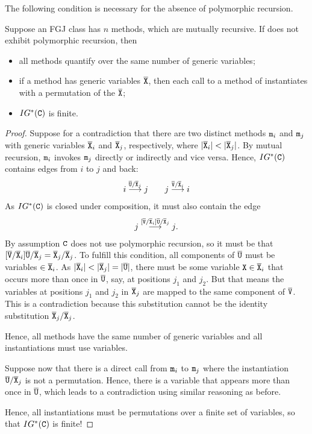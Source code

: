 The following condition is necessary for the absence of
polymorphic recursion.

\begin{proposition}\label{prop:polymorphi-recursion}
  Suppose an FGJ class  has $n$ methods, which are mutually
  recursive.
  If  does not exhibit
  polymorphic recursion, then
  \begin{itemize}
  \item all methods quantify over the same number of generic
    variables;
  \item if a method has generic variables $\overline{\tt X}$, then each call to
    a method of  instantiates with a permutation of the
    $\overline{\tt X}$;
  \item $IG^* ({\tt C})$ is finite.
  \end{itemize}
\end{proposition}
\begin{proof}
  Suppose for a contradiction that there are two distinct methods ${\tt m}_i$ and
  ${\tt m}_j$ with generic variables $\overline{\tt X}_i$ and $\overline{\tt X}_j$, respectively,
  where $|\overline{\tt X}_i| < |\overline{\tt X}_j|$. By mutual recursion, ${\tt m}_i$ invokes
  ${\tt m}_j$ directly or indirectly and vice versa. Hence, $IG^* ({\tt C})$
  contains edges from $i$ to $j$ and back:
  \begin{gather*}
    i \stackrel{\overline{\tt U}/\overline{\tt X}_j}{\longrightarrow} j
    \qquad
    j \stackrel{\overline{\tt V}/\overline{\tt X}_i}{\longrightarrow} i
  \end{gather*}
  As $IG^*({\tt C})$ is closed under composition, it must also contain
  the edge
  \begin{gather*}
    j \stackrel{[\overline{\tt V}/\overline{\tt X}_i]\overline{\tt U}/\overline{\tt X}_j}{\longrightarrow} j
    \text{.}
  \end{gather*}
  By assumption ${\tt C}$ does not use polymorphic recursion, so it
  must be that $[\overline{\tt V}/\overline{\tt X}_i]\overline{\tt U}/\overline{\tt X}_j =
  \overline{\tt X}_j/\overline{\tt X}_j$. To fulfill this condition, all components of
  $\overline{\tt U}$ must be variables $\in \overline{\tt X}_i$. As  $|\overline{\tt X}_i| <
  |\overline{\tt X}_j| = |\overline{\tt U}|$, there must be some variable ${\tt X} \in \overline{\tt X}_i$ that
  occurs more than once in $\overline{\tt U}$, say, at positions $j_1$ and $j_2$. 
  But that means the variables at positions $j_1$ and $j_2$ in
  $\overline{\tt X}_j$ are mapped to the same component of $\overline{\tt V}$. This is a
  contradiction because this substitution cannot be the identity
  substitution $\overline{\tt X}_j/\overline{\tt X}_j$.

  Hence, all methods have the same number of generic variables and all
  instantiations must use variables.

  Suppose now that there is a direct call from ${\tt m}_i$ to
  ${\tt m}_j$ where the instantiation $\overline{\tt U}/\overline{\tt X}_j$ is not a permutation. Hence,
  there is a variable that appears more than once in $\overline{\tt U}$, which
  leads to a contradiction using similar reasoning as before.

  Hence, all instantiations must be permutations over a finite set of
  variables, so that $IG^*({\tt C})$ is finite! 
\end{proof}

